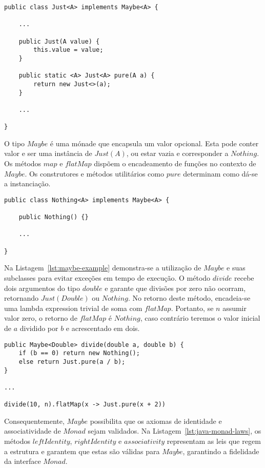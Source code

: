 \documentclass[10pt, conference]{IEEEtran}
\begin{document}
\begin{lstlisting}[caption = {Classe $Just$}, label = {lst:just-class}]
public class Just<A> implements Maybe<A> {

	...

	public Just(A value) {
		this.value = value;
	}

	public static <A> Just<A> pure(A a) {
		return new Just<>(a);
	}
    
	...

}
\end{lstlisting}

O tipo $Maybe$ é uma mónade que encapsula um valor opcional. Esta pode conter valor e ser uma instância de $Just(A)$, ou estar vazia e corresponder a $Nothing$. Os métodos $map$ e $flatMap$ dispõem o encadeamento de funções no contexto de $Maybe$. Os construtores e métodos utilitários  como $pure$ determinam como dá-se a instanciação.

\begin{lstlisting}[caption = {Classe $Nothing$}, label = {lst:nothing-class}]
public class Nothing<A> implements Maybe<A> {

	public Nothing() {}
    
	...

}
\end{lstlisting}

Na Listagem~\ref{lst:maybe-example} demonstra-se a utilização de $Maybe$ e suas subclasses para evitar exceções em tempo de execução. O método $divide$ recebe dois argumentos do tipo $double$ e garante que divisões por zero não ocorram, retornando $Just(Double)$ ou $Nothing$. No retorno deste método,  encadeia-se uma lambda expression trivial de soma com $flatMap$. Portanto, se $n$ assumir valor zero, o retorno de $flatMap$ é $Nothing$, caso contrário teremos o valor inicial de $a$ dividido por $b$ e acrescentado em dois.

\begin{lstlisting}[caption = {Exemplo de utilização de $Maybe$}, label = {lst:maybe-example}]
public Maybe<Double> divide(double a, double b) {
	if (b == 0) return new Nothing();
	else return Just.pure(a / b);
}

...

divide(10, n).flatMap(x -> Just.pure(x + 2))
\end{lstlisting}

Consequentemente, $Maybe$ possibilita que os axiomas de identidade e associatividade de $Monad$ sejam validados. Na Listagem~\ref{lst:java-monad-laws}, os métodos $leftIdentity$, $rightIdentity$ e $associativity$ representam as leis que regem a estrutura e garantem que estas são válidas para $Maybe$, garantindo a fidelidade da interface $Monad$.
\end{document}
